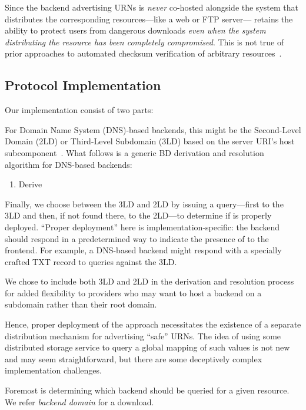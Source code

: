 Since the backend advertising URNs is \emph{never} co-hosted alongside the
system that distributes the corresponding resources---like a web or FTP
server---\SYSTEM{} retains the ability to protect users from dangerous downloads
\emph{even when the system distributing the resource has been completely
compromised}. This is not true of prior approaches to automated checksum
verification of arbitrary resources~\cite{Cherubini}.

\subsection{Protocol Implementation}


Our \SYSTEM{} implementation consist of two parts:

For Domain Name System (DNS)-based backends, this might be the Second-Level
Domain (2LD) or Third-Level Subdomain (3LD) based on the server URI's host
subcomponent~\cite{RFC3986}. What follows is a generic BD derivation and
resolution algorithm for DNS-based backends:

\begin{enumerate}
    \item Derive 
\end{enumerate}

Finally, we choose between the 3LD and 2LD by issuing a query---first to the 3LD
and then, if not found there, to the 2LD---to determine if \SYSTEM{} is properly
deployed. ``Proper deployment'' here is implementation-specific: the backend
should respond in a predetermined way to indicate the presence of \SYSTEM{} to
the frontend. For example, a DNS-based backend might respond with a specially
crafted TXT record to queries against the 3LD.

We chose to include both 3LD and 2LD in the derivation and resolution process
for added flexibility to providers who may want to host a backend on a subdomain
rather than their root domain.

Hence, proper deployment of the \SYSTEM{} approach necessitates the existence of
a separate distribution mechanism for advertising ``safe'' URNs. The idea of
using some distributed storage service to query a global mapping of such values
is not new and may seem straightforward, but there are some deceptively complex
implementation challenges.

Foremost is determining which backend should be queried for a
given resource. We refer \emph{backend domain} for a download. 

